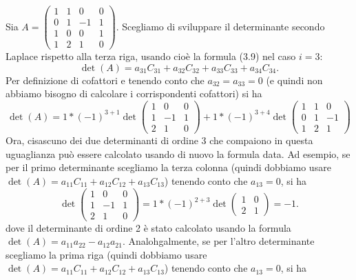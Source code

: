 \begin{esempio}
  Sia $A=\begin{pmatrix} 1 & 1 & 0 & 0 \\ 0 & 1 & -1 & 1 \\ 1 & 0 & 0 & 1 \\ 1 & 2 & 1 & 0\end{pmatrix}$. Scegliamo di sviluppare il determinante secondo Laplace rispetto alla terza riga, usando cioè la formula (3.9) nel caso $i = 3$:
  \begin{equation*}
    \det (A)=a_{31}C_{31}+a_{32}C_{32}+a_{33}C_{33}+a_{34}C_{34}.
  \end{equation*}
  Per definizione di cofattori e tenendo conto che $a_{32}=a_{33}=0$ (e quindi non abbiamo bisogno di calcolare i corrispondenti cofattori) si ha
  \begin{equation}
	\det(A)=1*(-1)^{3+1}\det\begin{pmatrix} 1 & 0 & 0 \\ 1 & -1 & 1 \\ 2 & 1 & 0\end{pmatrix} + 1*(-1)^{3+4}\det\begin{pmatrix} 1 & 1 & 0 \\ 0 & 1 & -1 \\ 1 & 2 & 1\end{pmatrix}
  \end{equation}
  Ora, cisascuno dei due determinanti di ordine 3 che compaiono in questa uguaglianza può essere calcolato usando di nuovo la formula data. Ad esempio, se per il primo determinante scegliamo la terza colonna (quindi dobbiamo usare $\det (A)=a_{11}C_{11}+a_{12}C_{12}+a_{13}C_{13}$) tenendo conto che $a_{13}=0$, si ha
  \begin{equation*}
	\det\begin{pmatrix} 1 & 0 & 0 \\ 1 & -1 & 1 \\ 2 & 1 & 0\end{pmatrix}=1*(-1)^{2+3}\det\begin{pmatrix} 1 & 0 \\ 2 & 1 \end{pmatrix}=-1.
  \end{equation*}
  dove il determinante di ordine 2 è stato calcolato usando la formula $\det(A)=a_{11}a_{22}-a_{12}a_{21}$.
  Analohgalmente, se per l'altro determinante scegliamo la prima riga (quindi dobbiamo usare
  $\det (A)=a_{11}C_{11}+a_{12}C_{12}+a_{13}C_{13}$) tenendo conto che $a_{13}=0$, si ha
  \begin{equation*}

\end{equation*}
\end{esempio}
